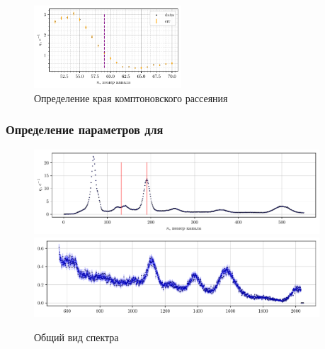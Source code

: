 \begin{figure}[h!]
    \centering
    \includegraphics[width=0.49\textwidth]{figures/am_comp1.pdf}
    \vspace{-2mm}
    \caption{Определение края комптоновского рассеяния \am}
\end{figure}



\newpage

\subsubsection*{Определение параметров для \eu}
\vspace{-5mm}

\begin{figure}[h!]
    \centering
    \includegraphics[width=0.95\textwidth]{figures/eu_0.pdf}
    \includegraphics[width=0.95\textwidth]{figures/eu_1.pdf}
    \caption{Общий вид спектра \cs}
\end{figure}


